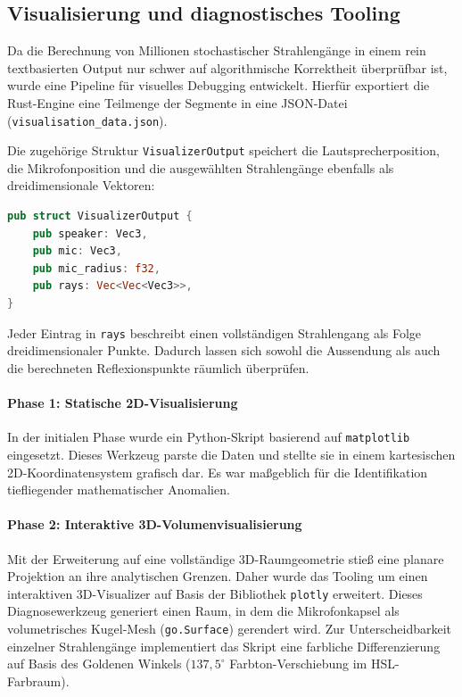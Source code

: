 \subsection{Visualisierung und diagnostisches Tooling}
\label{subsec:visualizer}

Da die Berechnung von Millionen stochastischer Strahlengänge in einem rein textbasierten Output nur schwer auf algorithmische Korrektheit überprüfbar ist, wurde eine Pipeline für visuelles Debugging entwickelt. Hierfür exportiert die Rust-Engine eine Teilmenge der Segmente in eine JSON-Datei (\texttt{visualisation\_data.json}).

Die zugehörige Struktur \texttt{VisualizerOutput} speichert die
Lautsprecherposition, die Mikrofonposition und die ausgewählten Strahlengänge
ebenfalls als dreidimensionale Vektoren:

\begin{lstlisting}[language=Rust]
pub struct VisualizerOutput {
    pub speaker: Vec3,
    pub mic: Vec3,
    pub mic_radius: f32,
    pub rays: Vec<Vec<Vec3>>,
}
\end{lstlisting}

Jeder Eintrag in \texttt{rays} beschreibt einen vollständigen Strahlengang als
Folge dreidimensionaler Punkte. Dadurch lassen sich sowohl die Aussendung als
auch die berechneten Reflexionspunkte räumlich überprüfen.


\paragraph{Phase 1: Statische 2D-Visualisierung}
In der initialen Phase wurde ein Python-Skript basierend auf \texttt{matplotlib} eingesetzt. Dieses Werkzeug parste die Daten und stellte sie in einem kartesischen 2D-Koordinatensystem grafisch dar. Es war maßgeblich für die Identifikation tiefliegender mathematischer Anomalien.

\paragraph{Phase 2: Interaktive 3D-Volumenvisualisierung}
Mit der Erweiterung auf eine vollständige 3D-Raumgeometrie stieß eine planare Projektion an ihre analytischen Grenzen. Daher wurde das Tooling um einen interaktiven 3D-Visualizer auf Basis der Bibliothek \texttt{plotly} erweitert.
Dieses Diagnosewerkzeug generiert einen Raum, in dem die Mikrofonkapsel als volumetrisches Kugel-Mesh (\texttt{go.Surface}) gerendert wird. Zur Unterscheidbarkeit einzelner Strahlengänge implementiert das Skript eine farbliche Differenzierung auf Basis des Goldenen Winkels ($137{,}5^\circ$ Farbton-Verschiebung im HSL-Farbraum).

